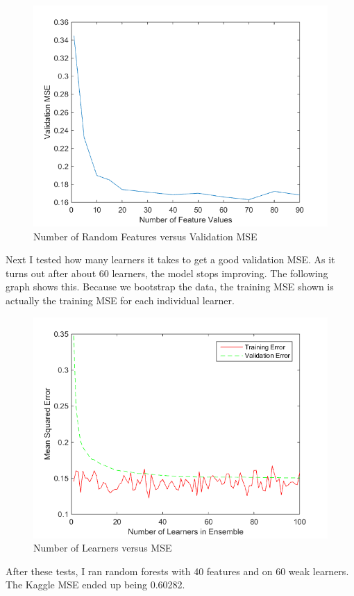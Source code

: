 \documentclass[twoside,11pt]{article}
\theoremstyle{definition}
\begin{document}
\begin{figure}[h!]
\centering
\includegraphics[width=4 in]{numFeatValuesVersusMSE.png}
\caption{Number of Random Features versus Validation MSE}
\end{figure}

\newpage

Next I tested how many learners it takes to get a good validation MSE. As it turns out after about 60 learners, the model stops improving. The following graph shows this. Because we bootstrap the data, the training MSE shown is actually the training MSE for each individual learner. \\

\begin{figure}[h!]
\centering
\includegraphics[width=4 in]{numLearnersVersusMSE.png}
\caption{Number of Learners versus MSE}
\end{figure}

After these tests, I ran random forests with 40 features and on 60 weak learners. The Kaggle MSE ended up being 0.60282. 

\newpage
\end{document}
